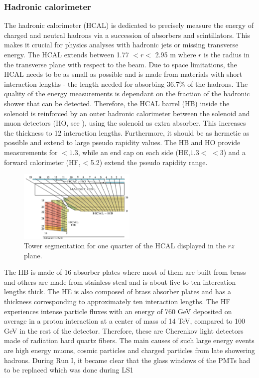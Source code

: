 \subsubsection{Hadronic calorimeter}
The hadronic calorimeter (HCAL) is dedicated to precisely measure the energy of charged and neutral hadrons via a succession of absorbers and scintillators. This makes it crucial for physics analyses with hadronic jets or missing transverse energy. The HCAL extends between 1.77 $<r<$ 2.95 \si{ \meter} where $r$ is the radius in the transverse plane with respect to the beam. Due to space limitations, the HCAL needs to be as small as possible and is made from materials with short interaction lengths - the length needed for absorbing 36.7\% of the hadrons. The quality of the energy measurements is dependant on the fraction of the hadronic shower that can be detected. Therefore, the HCAL barrel (HB) inside the solenoid is reinforced by an outer hadronic calorimeter between the solenoid and muon detectors (HO, see ), using the solenoid as extra absorber. This increases the thickness to 12 interaction lengths. Furthermore, it should be as hermetic as possible and extend to large pseudo rapidity values. The HB and HO provide measurements for \abspsrap $<1.3$, while an end cap on each side (HE,$1.3<$ \abspsrap $<3$) and a forward calorimeter (HF, \abspsrap < 5.2) extend the pseudo rapidity range. 


\begin{figure}[htbp]
	\centering
	\includegraphics[width=0.5\textwidth]{2_ExperimentalSetup/Figures/imageedit_12_3242046754}
	\caption{Tower segmentation for one quarter of the HCAL displayed in the $rz$ plane\cite{Chatrchyan:2008aa}.}
	\label{fig:HCAL}
\end{figure}

The HB is made of 16 absorber plates where most of them are built from brass and others are made from stainless steal and is about five to ten intercation lengths thick. The HE is also composed of brass absorber plates and has a thickness corresponding to approximately ten interaction lengths. 
The HF experiences intense particle fluxes with an energy of 760 \si{ \GeV} deposited on average in a proton interaction at a center of mass of 14 \si{ \TeV}, compared to 100 \si{ \GeV} in the rest of the detector. Therefore, these are Cherenkov light detectors made of radiation hard quartz fibers.
The main causes of such large energy events are high energy muons, cosmic particles and charged particles from late showering hadrons. During  Run I, it became clear that the glass windows of the PMTs had to be replaced which was done during LS1 \cite{Tiras:2016ghv}
	
